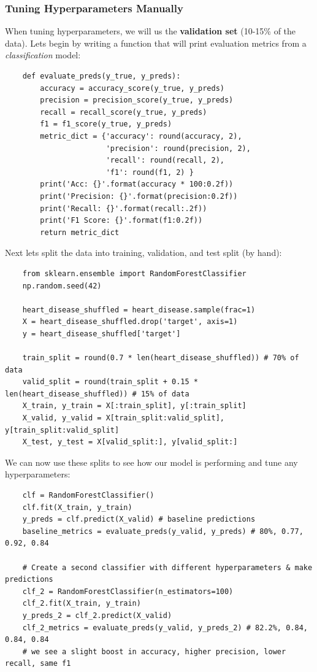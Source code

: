\documentclass[11pt, a4paper]{article}
\begin{document}
\begin{spacing}{1.1}
	\subsubsection{Tuning Hyperparameters Manually}
	When tuning hyperparameters, we will us the \textbf{validation set} (10-15\% of the data). Lets begin by writing a function that will print evaluation metrics from a \textit{classification} model:
	\begin{lstlisting}
	def evaluate_preds(y_true, y_preds):
		accuracy = accuracy_score(y_true, y_preds)
		precision = precision_score(y_true, y_preds)
		recall = recall_score(y_true, y_preds)
		f1 = f1_score(y_true, y_preds)
		metric_dict = {'accuracy': round(accuracy, 2),
		               'precision': round(precision, 2),
		               'recall': round(recall, 2),
		               'f1': round(f1, 2) }
		print('Acc: {}'.format(accuracy * 100:0.2f))              
		print('Precision: {}'.format(precision:0.2f))
		print('Recall: {}'.format(recall:.2f))
		print('F1 Score: {}'.format(f1:0.2f))
		return metric_dict \end{lstlisting} \vspace*{1mm}
	Next lets split the data into training, validation, and test split (by hand):
	\begin{lstlisting}
	from sklearn.ensemble import RandomForestClassifier
	np.random.seed(42)
	
	heart_disease_shuffled = heart_disease.sample(frac=1)
	X = heart_disease_shuffled.drop('target', axis=1)
	y = heart_disease_shuffled['target']
	
	train_split = round(0.7 * len(heart_disease_shuffled)) # 70% of data
	valid_split = round(train_split + 0.15 * len(heart_disease_shuffled)) # 15% of data
	X_train, y_train = X[:train_split], y[:train_split]
	X_valid, y_valid = X[train_split:valid_split], y[train_split:valid_split]
	X_test, y_test = X[valid_split:], y[valid_split:] \end{lstlisting} \newpage

	\noindent We can now use these splits to see how our model is performing and tune any hyperparameters:
	\begin{lstlisting}
	clf = RandomForestClassifier()
	clf.fit(X_train, y_train)
	y_preds = clf.predict(X_valid) # baseline predictions
	baseline_metrics = evaluate_preds(y_valid, y_preds) # 80%, 0.77, 0.92, 0.84
	
	# Create a second classifier with different hyperparameters & make predictions
	clf_2 = RandomForestClassifier(n_estimators=100)
	clf_2.fit(X_train, y_train)
	y_preds_2 = clf_2.predict(X_valid)
	clf_2_metrics = evaluate_preds(y_valid, y_preds_2) # 82.2%, 0.84, 0.84, 0.84
	# we see a slight boost in accuracy, higher precision, lower recall, same f1 \end{lstlisting} \vspace*{1mm}

\end{spacing}
\end{document}

